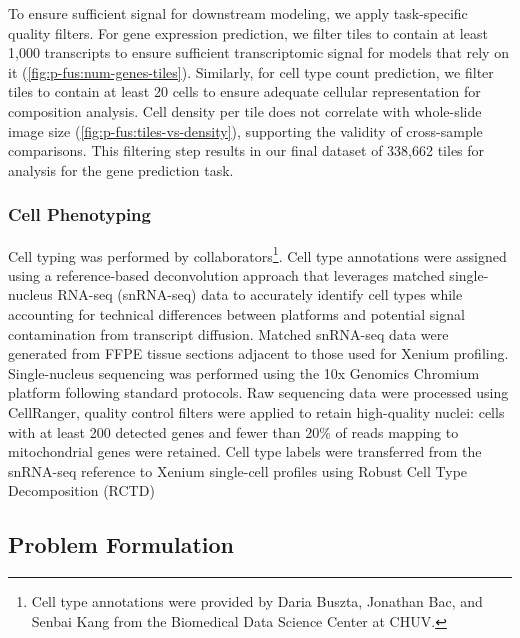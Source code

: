 To ensure sufficient signal for downstream modeling, we apply task-specific quality filters. For gene expression prediction, we filter tiles to contain at least 1{,}000 transcripts to ensure sufficient transcriptomic signal for models that rely on it (\autoref{fig:p-fus:num-genes-tiles}). Similarly, for cell type count prediction, we filter tiles to contain at least 20 cells to ensure adequate cellular representation for composition analysis. Cell density per tile does not correlate with whole-slide image size (\autoref{fig:p-fus:tiles-vs-density}), supporting the validity of cross-sample comparisons. This filtering step results in our final dataset of 338{,}662 tiles for analysis for the gene prediction task.

\subsubsection{Cell Phenotyping}
\label{sec:p-fus:cell-phenotyping}

Cell typing was performed by collaborators\footnote{Cell type annotations were provided by Daria Buszta, Jonathan Bac, and Senbai Kang from the Biomedical Data Science Center at CHUV.}. Cell type annotations were assigned using a reference-based deconvolution approach that leverages matched single-nucleus RNA-seq (snRNA-seq) data to accurately identify cell types while accounting for technical differences between platforms and potential signal contamination from transcript diffusion. Matched snRNA-seq data were generated from FFPE tissue sections adjacent to those used for Xenium profiling. Single-nucleus sequencing was performed using the 10x Genomics Chromium platform following standard protocols. Raw sequencing data were processed using CellRanger, quality control filters were applied to retain high-quality nuclei: cells with at least 200 detected genes and fewer than 20\% of reads mapping to mitochondrial genes were retained. Cell type labels were transferred from the snRNA-seq reference to Xenium single-cell profiles using Robust Cell Type Decomposition (RCTD)~\cite{cable_robustdecompositioncell_2022}

\subsection*{Problem Formulation}
\label{sec:problem-formulation}


